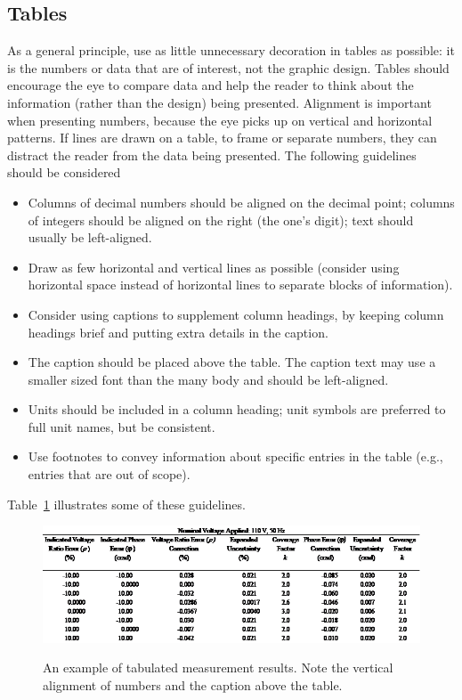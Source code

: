 \subsection{Tables}
As a general principle, use as little unnecessary decoration in tables as possible: it is the numbers or data that are of interest, not the graphic design. Tables should encourage the eye to compare data and help the reader to think about the information (rather than the design) being presented. 
Alignment is important when presenting numbers, because the eye picks up on vertical and horizontal patterns. If lines are drawn on a table, to frame or separate numbers, they can distract the reader from the data being presented. 
The following guidelines should be considered
\begin{itemize}
\item	Columns of decimal numbers should be aligned on the decimal point; columns of integers should be aligned on the right (the one's digit); text should usually be left-aligned.
\item	Draw as few horizontal and vertical lines as possible (consider using horizontal space instead of horizontal lines to separate blocks of information).
\item	Consider using captions to supplement column headings, by keeping column headings brief and putting extra details in the caption.
\item	The caption should be placed above the table. The caption text may use a smaller sized font than the many body and should be left-aligned.
\item	Units should be included in a column heading; unit symbols are preferred to full unit names, but be consistent.
\item	Use footnotes to convey information about specific entries in the table (e.g., entries that are out of scope).
\end{itemize}   
Table~\ref{tab:electrical_results} illustrates some of these guidelines.

\clearpage
\begin{figure}
\includegraphics[width=\textwidth]{pictures/table_electrical_results}
\label{tab:electrical_results}
\caption{An example of tabulated measurement results. Note the vertical alignment of numbers and the caption above the table.}
\end{figure}
\clearpage

